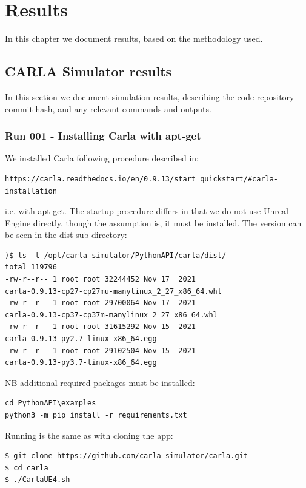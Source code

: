 \chapter{Results} %
\label{Appendix-results} %
In this chapter we document results, based on the methodology used.

\section{CARLA Simulator results}
In this section we document simulation results, describing the code repository commit hash, and any relevant commands and outputs.

\subsection{Run 001 - Installing Carla with apt-get}

We installed Carla following procedure described in:

\begin{verbatim}
https://carla.readthedocs.io/en/0.9.13/start_quickstart/#carla-installation
\end{verbatim}

i.e. with apt-get. The startup procedure differs in that we do not use 
Unreal Engine directly, though the assumption is, it must be installed.
The version can be seen in the dist sub-directory:

\begin{verbatim}
)$ ls -l /opt/carla-simulator/PythonAPI/carla/dist/
total 119796
-rw-r--r-- 1 root root 32244452 Nov 17  2021 
carla-0.9.13-cp27-cp27mu-manylinux_2_27_x86_64.whl
-rw-r--r-- 1 root root 29700064 Nov 17  2021 
carla-0.9.13-cp37-cp37m-manylinux_2_27_x86_64.whl
-rw-r--r-- 1 root root 31615292 Nov 15  2021 
carla-0.9.13-py2.7-linux-x86_64.egg
-rw-r--r-- 1 root root 29102504 Nov 15  2021 
carla-0.9.13-py3.7-linux-x86_64.egg
\end{verbatim}

NB additional required packages must be installed:

\begin{verbatim}
cd PythonAPI\examples
python3 -m pip install -r requirements.txt    
\end{verbatim}

Running is the same as with cloning the app:

\begin{verbatim}
$ git clone https://github.com/carla-simulator/carla.git
$ cd carla
$ ./CarlaUE4.sh
\end{verbatim}

